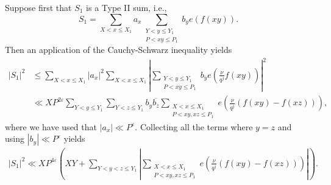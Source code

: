 \documentclass[a4paper,10pt]{amsart}
\numberwithin{equation}{section}
\theoremstyle{definition}
\theoremstyle{remark}
\renewcommand{\lvert}{\left\vert}
\renewcommand{\rvert}{\right\vert}
\begin{document}
Suppose first that $S_1$ is a Type II sum, i.e.,
\[
S_1=\sum_{X<x\leq X_1}a_x\sum_{\substack{Y<y\leq Y_1\\P<xy\leq
    P_1}}b_ye\left(f(xy)\right).
\]
Then an application of the Cauchy-Schwarz inequality yields
\begin{align*} 
\lvert S_1\rvert^2
&\leq\sum_{X<x\leq X_1}\lvert a_x\rvert^2\sum_{X<x\leq X_1}
  \lvert\sum_{\substack{Y<y\leq Y_1\\P<xy\leq P_1}}b_ye\left(\frac{\nu}{q^j}f(xy)\right)\rvert^2\\
&\ll XP^{2\varepsilon}\sum_{Y<y\leq Y_1}\sum_{Y<z\leq Y_1}b_y\overline{b_z}
  \sum_{\substack{X<x\leq X_1\\P<xy,xz\leq P_1}}e\left(\frac{\nu}{q^j}\left(f(xy)-f(xz)\right)\right),
\end{align*}
where we have used that $\lvert a_x\rvert\ll P^\varepsilon$. Collecting all the
terms where $y=z$ and using $\lvert b_y\rvert\ll P^\varepsilon$ yields 
\begin{gather}\label{mani:3.5}
\lvert S_1\rvert^2\ll XP^{4\varepsilon}\left(XY+\sum_{Y<y<z\leq Y_1}
  \lvert\sum_{\substack{X<x\leq X_1\\P<xy,xz\leq P_1}}e\left(\frac{\nu}{q^j}\left(f(xy)-f(xz)\right)\right)\rvert\right).
\end{gather}
\end{document}

